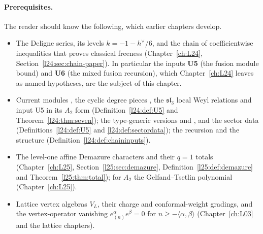 \paragraph{Prerequisites.} The reader should know the following, which earlier chapters develop.
\begin{itemize}
\item The Deligne series, its levels $k=-1-h^\vee/6$, and the chain of coefficientwise inequalities that proves
  classical freeness (Chapter~\ref{ch:L24}, Section~\ref{l24:sec:chain-paper}). In particular the inputs
  \textbf{U5} (the fusion module bound) and \textbf{U6} (the mixed fusion recursion), which Chapter~\ref{ch:L24}
  leaves as named hypotheses, are the subject of this chapter.
\item Current modules , the cyclic degree pieces , the $\mathfrak{sl}_3$ local Weyl
  relations  and input U5 in its $A_2$ form 
  (Definition~\ref{l24:def:U5} and Theorem~\ref{l24:thm:seven}); the type-generic versions
   and , and the sector data 
  (Definitions~\ref{l24:def:U5} and \ref{l24:def:sectordata}); the recursion  and the structure
   (Definition~\ref{l24:def:chaininputs}).
\item The level-one affine Demazure characters and their $q=1$ totals (Chapter~\ref{ch:L25},
  Section~\ref{l25:sec:demazure}, Definition~\ref{l25:def:demazure} and Theorem~\ref{l25:thm:total}); for $A_2$ the
  Gelfand--Tsetlin polynomial  (Chapter~\ref{ch:L25}).
\item Lattice vertex algebras $V_L$, their charge and conformal-weight gradings, and the vertex-operator vanishing
  $e^\alpha_{(n)}e^\beta=0$ for $n\ge-\langle\alpha,\beta\rangle$ (Chapter~\ref{ch:L03} and the lattice chapters).
\end{itemize}

